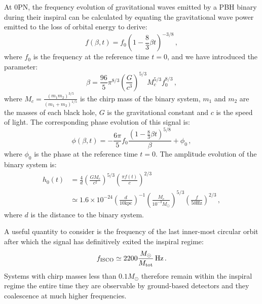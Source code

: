 \documentclass[aps,prd,amsmath,floats,floatfix, twocolumn,
superscriptaddress,nofootinbib,showpacs]{revtex4-2}
\newcommand{\bet}{\ensuremath{\frac{96}{5}\pi^{8/3}\left(\frac{G}{c^3}\right)^{5/3}M^{5/3}_cf^{8/3}_0}}
\begin{document}
At 0PN, the frequency evolution of gravitational waves emitted by a PBH binary during their inspiral can be calculated by equating the gravitational wave power emitted to the loss of orbital energy to derive:
\begin{equation}
    f(\beta, t) = f_0 \left( 1-\frac{8}{3}\beta t \right)^{-3/8} \, , \label{eq:f}
\end{equation}
where $f_0$ is the frequency at the reference time $t=0$, and we have introduced the parameter:
\begin{equation}
    \beta = \bet \, ,
\end{equation}
where $M_c = \frac{(m_1 m_2)^{3/5}}{(m_1 + m_2)^{1/5}}$ is the chirp mass of the binary system, $m_1$ and $m_2$ are the masses of each black hole, $G$ is the gravitational constant and $c$ is the speed of light. The corresponding phase evolution of this signal is:
\begin{equation}
    \phi(\beta, t) = -\frac{6\pi}{5} f_0 \frac{(1-\frac{8}{3}\beta t)^{5/8}}{\beta} + \phi_0 \, , \label{eq:phi}
\end{equation}
where $\phi_0$ is the phase at the reference time $t=0$. The amplitude evolution of the binary system is: 
\begin{align}
h_0(t) &= \frac{4}{d} \left( \frac{G M_c}{c^2} \right)^{5/3} \left(  \frac{\pi f(t)}{c} \right)^{2/3}  \label{eq:h0} \\
& \simeq 1.6 \times 10^{-24} \left( \frac{d}{10 \text{kpc}}  \right) ^{-1} \left(  \frac{M_c}{10^{-3} M_\odot} \right) ^{5/3} \left(  \frac{f}{50\text{Hz}} \right)^{2/3} \, ,
\end{align}
where $d$ is the distance to the binary system. 

A useful quantity to consider is the frequency of the last inner-most circular orbit after which the signal has definitively exited the inspiral regime:
\begin{gather}
    f_{\rm ISCO} \simeq 2200 \frac{M_\odot}{M_{\rm tot}} \, \mathrm{Hz} \, .
\end{gather}
Systems with chirp masses less than $0.1 M_\odot$ therefore remain within the inspiral regime the entire time they are observable by ground-based detectors and they coalescence at much higher frequencies. 
\end{document}
